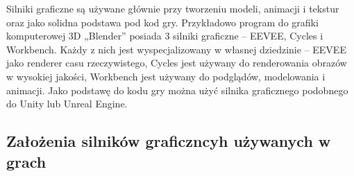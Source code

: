 \documentclass[12pt,twoside]{article}
\begin{document}
Silniki graficzne są używane głównie przy tworzeniu modeli, animacji i tekstur
oraz jako solidna podstawa pod kod gry. Przykładowo program do grafiki
komputerowej 3D „Blender” posiada 3 silniki graficzne -- EEVEE\cite{Blender:EEVEE}, Cycles\cite{Blender:Cycles}
i Workbench\cite{Blender:Workbench}. Każdy z nich jest wyspecjalizowany w własnej dziedzinie – EEVEE
jako renderer casu rzeczywistego, Cycles jest używany do renderowania obrazów w
wysokiej jakości, Workbench jest używany do podglądów, modelowania i animacji.
Jako podstawę do kodu gry można użyć silnika graficznego podobnego do Unity lub
Unreal Engine. 


\subsection{Założenia silników graficzncyh używanych w grach}
\end{document}
